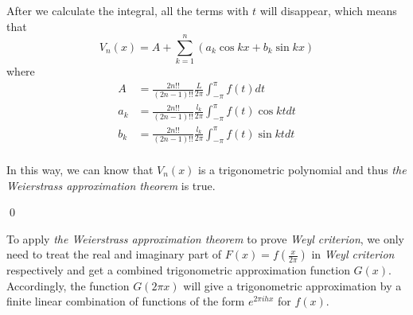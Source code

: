 \documentclass[12pt]{article}
\begin{document}
\par After we calculate the integral, all the terms with $t$ will disappear, which means that 
\begin{equation*}
V_n(x)=A+\sum_{k=1}^{n}(a_k\cos{kx}+b_k\sin{kx})
\end{equation*}
where 
\[
\begin{split}
A&=\frac{2n!!}{(2n-1)!!}\frac{L}{2\pi}\int_{-\pi}^{\pi}f(t)dt\\
a_k&=\frac{2n!!}{(2n-1)!!}\frac{l_k}{2\pi}\int_{-\pi}^{\pi}f(t)\cos{kt}dt\\
b_k&=\frac{2n!!}{(2n-1)!!}\frac{l_k}{2\pi}\int_{-\pi}^{\pi}f(t)\sin{kt}dt\\
\end{split}
\]
\par In this way, we can know that $V_n(x)$ is a trigonometric polynomial and thus \emph{the Weierstrass approximation theorem} is true. 
\par \qed
\par To apply \emph{the Weierstrass approximation theorem} to prove \emph{Weyl criterion}, we only need to treat the real and imaginary part of $F(x)=f(\frac{x}{2\pi})$ in \emph{Weyl criterion} respectively and get a combined trigonometric approximation function $G(x)$. Accordingly, the function $G(2\pi x)$ will give a trigonometric approximation by a finite linear combination of functions of the form $e^{2\pi i hx}$ for $f(x)$.
\end{document}
